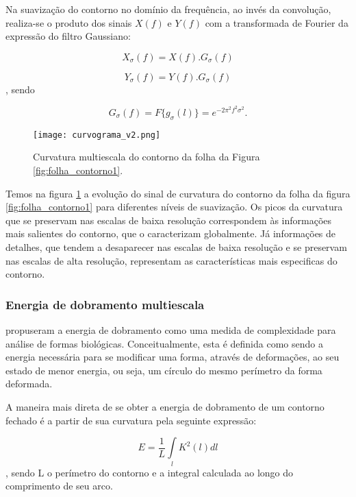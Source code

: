 Na suavização do contorno no domínio da frequência, ao invés da convolução, realiza-se o produto dos sinais $X(f)$ e $Y(f)$ com a transformada de Fourier da expressão do filtro Gaussiano:

\begin{equation}
X_\sigma(f) = X(f).G_\sigma(f)
\end{equation}

\begin{equation}
Y_\sigma(f) = Y(f).G_\sigma(f)
\end{equation}, sendo

\begin{equation}
G_\sigma(f) = F\big\{ g_{\sigma}(l)\big\} = e^{-2 \pi^2 f^2 \sigma^2}\text{.}
\end{equation}

\begin{figure}[h!]
  \caption{\label{fig:curv_ms} Curvatura multiescala do contorno da folha da Figura \ref{fig:folha_contorno1}.}
  \centering
  \texttt{[image: curvograma\_v2.png]}
\end{figure}

Temos na figura \ref{fig:curv_ms} a evolução do sinal de curvatura do contorno da folha da figura \ref{fig:folha_contorno1} para diferentes níveis de suavização. Os picos da curvatura que se preservam nas escalas de baixa resolução correspondem às informações mais salientes do contorno, que o caracterizam globalmente. Já informações de detalhes, que tendem a desaparecer nas escalas de baixa resolução e se preservam nas escalas de alta resolução, representam as características mais especificas do contorno.

\subsubsection{Energia de dobramento multiescala\label{subsec:BE}}

 propuseram a energia de dobramento como uma medida de complexidade para análise de formas biológicas. Conceitualmente, esta é definida como sendo a energia necessária para se modificar uma forma, através de deformações, ao seu estado de menor energia, ou seja, um círculo do mesmo perímetro da forma deformada.

A maneira mais direta de se obter a energia de dobramento de um contorno fechado é a partir de sua curvatura pela seguinte expressão:

\begin{equation}\label{eq:be}
E = \frac{1}{L}\int\limits_{l}K^2(l)dl
\end{equation}, sendo L o perímetro do contorno e a integral calculada ao longo do comprimento de seu arco.

